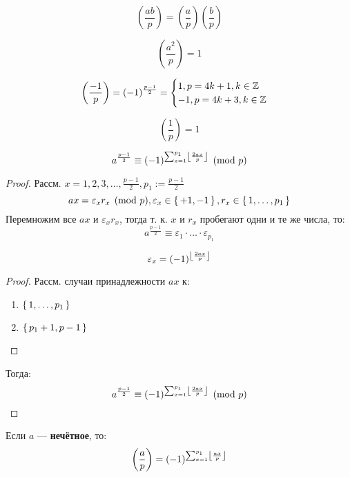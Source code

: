 \begin{consequence}
  \label{cs:01_1}
\[
\left(\frac{ab}{p}\right) = \left(\frac{a}{p}\right)\left(\frac{b}{p}\right)
\]
\end{consequence}
\begin{consequence}
  \label{cs:01_2}
\[
\left(\frac{a^{2}}{p}\right) = 1
\]
\end{consequence}
\begin{consequence}
  \label{cs:01_3}
\[
\left(\frac{-1}{p}\right) = (-1)^{\frac{p - 1}{2}} = \begin{cases}
1, p = 4k + 1, k \in \mathbb{Z} \\
-1, p = 4k + 3, k \in \mathbb{Z}
\end{cases}
\]
\end{consequence}
\begin{consequence}
  \label{cs:01_4}
\[
\left(\frac{1}{p}\right) = 1
\]
\end{consequence}
\begin{statement}
  \label{statement:01_2}
\[
  a^{\frac{p - 1}{2}} \equiv (-1)^{\sum_{x = 1}^{p_1} \left\lfloor \frac{2ax}{p} \right\rfloor} \pmod p
\]
\end{statement}
\begin{proof}
Рассм. $x = 1, 2, 3, \ldots, \frac{p - 1}{2}, p_1 := \frac{p - 1}{2}$
\[
ax = \varepsilon_x r_x \pmod p, \varepsilon_x \in \set{+1, -1}, r_x \in \set{1, \ldots, p_1}
\]
Перемножим все $ax$ и $\varepsilon_x r_x$, тогда т. к. $x$ и $r_x$ пробегают одни и те же числа, то:
\[
a^{\frac{p - 1}{2}} \equiv \varepsilon_1 \cdot \ldots \cdot \varepsilon_{p_1}
\]
\begin{statement}
  \label{statement:01_3}
\[
\varepsilon_x = (-1)^{\left\lfloor \frac{2ax}{p} \right\rfloor}
\]
\end{statement}
\begin{proof}
Рассм. случаи принадлежности $ax$ к:
\begin{enumerate}
  \item $\set{1, \ldots, p_1}$
  \item $\set{p_1 + 1, p - 1}$
\end{enumerate}
\end{proof}
Тогда:
\[
  a^{\frac{p - 1}{2}} \equiv (-1)^{\sum_{x = 1}^{p_1} \left\lfloor \frac{2ax}{p} \right\rfloor} \pmod p
\]
\end{proof}
\begin{statement}
  \label{statement:01_4}
Если $a$ --- \textbf{нечётное}, то:
\[
  \left(\frac{a}{p}\right) = (-1)^{\sum_{x = 1}^{p_1} \left\lfloor \frac{ax}{p} \right\rfloor}
\]
\end{statement}

